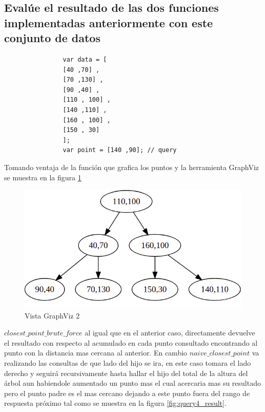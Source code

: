 \documentclass{article}
\begin{document}
		    
		
		\subsection{Evalúe el resultado de las dos funciones implementadas anteriormente con este conjunto de datos} 
		
		    \begin{verbatim}
		        var data = [
                [40 ,70] ,
                [70 ,130] ,
                [90 ,40] ,
                [110 , 100] ,
                [140 ,110] ,
                [160 , 100] ,
                [150 , 30]
                ];
                var point = [140 ,90]; // query
		    \end{verbatim} 
		    
		    Tomando ventaja de la función que grafica los puntos y la herramienta GraphViz se muestra en la figura \ref{fig:query3}
		    
		    \begin{figure}[H]
    			\centering
    			\includegraphics[scale=0.35]{img/query3.png}
    			\caption{Vista GraphViz 2}
    			\label{fig:query3}
    		\end{figure}
    		
    		$closest\_point\_brute\_force$ al igual que en el anterior caso, directamente devuelve el resultado con respecto al acumulado en cada punto consultado encontrando al punto con la distancia mas cercana al anterior. En cambio $naive\_closest\_point$ va realizando las consultas de que lado del hijo se ira, en este caso tomara el lado derecho y seguirá recursivamente hasta hallar el hijo del total de la altura del árbol aun habiendole aumentado un punto mas el cual acercaria mas su resultado pero el punto padre es el mas cercano dejando a este punto fuera del rango de respuesta próximo tal como se muestra en la figura \ref{fig:query4_result}.
    		
\end{document}
